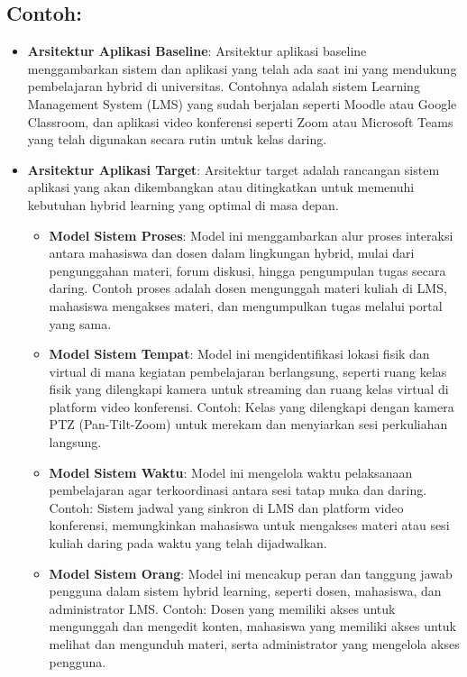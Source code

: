 \subsection*{Contoh:}

\begin{itemize}
	\item \textbf{Arsitektur Aplikasi Baseline}: Arsitektur aplikasi baseline menggambarkan sistem dan aplikasi yang telah ada saat ini yang mendukung pembelajaran hybrid di universitas. Contohnya adalah sistem Learning Management System (LMS) yang sudah berjalan seperti Moodle atau Google Classroom, dan aplikasi video konferensi seperti Zoom atau Microsoft Teams yang telah digunakan secara rutin untuk kelas daring.
	
	\item \textbf{Arsitektur Aplikasi Target}: Arsitektur target adalah rancangan sistem aplikasi yang akan dikembangkan atau ditingkatkan untuk memenuhi kebutuhan hybrid learning yang optimal di masa depan.
	\begin{itemize}
		\item \textbf{Model Sistem Proses}: Model ini menggambarkan alur proses interaksi antara mahasiswa dan dosen dalam lingkungan hybrid, mulai dari pengunggahan materi, forum diskusi, hingga pengumpulan tugas secara daring. Contoh proses adalah dosen mengunggah materi kuliah di LMS, mahasiswa mengakses materi, dan mengumpulkan tugas melalui portal yang sama.
		\item \textbf{Model Sistem Tempat}: Model ini mengidentifikasi lokasi fisik dan virtual di mana kegiatan pembelajaran berlangsung, seperti ruang kelas fisik yang dilengkapi kamera untuk streaming dan ruang kelas virtual di platform video konferensi. Contoh: Kelas yang dilengkapi dengan kamera PTZ (Pan-Tilt-Zoom) untuk merekam dan menyiarkan sesi perkuliahan langsung.
		\item \textbf{Model Sistem Waktu}: Model ini mengelola waktu pelaksanaan pembelajaran agar terkoordinasi antara sesi tatap muka dan daring. Contoh: Sistem jadwal yang sinkron di LMS dan platform video konferensi, memungkinkan mahasiswa untuk mengakses materi atau sesi kuliah daring pada waktu yang telah dijadwalkan.
		\item \textbf{Model Sistem Orang}: Model ini mencakup peran dan tanggung jawab pengguna dalam sistem hybrid learning, seperti dosen, mahasiswa, dan administrator LMS. Contoh: Dosen yang memiliki akses untuk mengunggah dan mengedit konten, mahasiswa yang memiliki akses untuk melihat dan mengunduh materi, serta administrator yang mengelola akses pengguna.
	\end{itemize}
	

\end{itemize}

